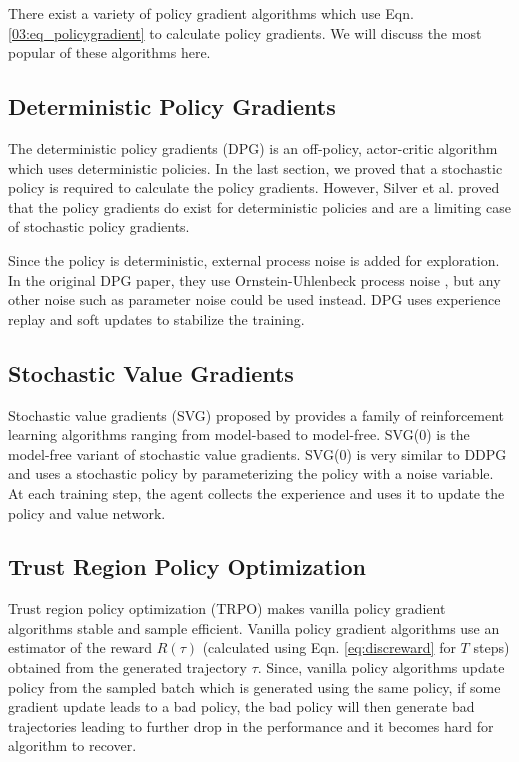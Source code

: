 There exist a variety of policy gradient algorithms which use Eqn. \ref{03:eq_policygradient} to calculate policy gradients. We will discuss the most popular of these algorithms here.

\subsection{Deterministic Policy Gradients}
The deterministic policy gradients (DPG) \cite{silver2014deterministic} is an off-policy, actor-critic algorithm which uses deterministic policies. In the last section, we proved that a stochastic policy is required to calculate the policy gradients. However, Silver et al. proved that the policy gradients do exist for deterministic policies and are a limiting case of stochastic policy gradients.

Since the policy is deterministic, external process noise is added for exploration. In the original DPG paper, they use Ornstein-Uhlenbeck process noise \cite{ounoise}, but any other noise such as parameter noise \cite{paramnoise} could be used instead. DPG uses experience replay and soft updates to stabilize the training. 

\subsection{Stochastic Value Gradients}
Stochastic value gradients (SVG) proposed by \cite{svg} provides a family of reinforcement learning algorithms ranging from model-based to model-free. SVG(0) is the model-free variant of stochastic value gradients. SVG(0) is very similar to DDPG and uses a stochastic policy by parameterizing the policy with a noise variable. At each training step, the agent collects the experience and uses it to update the policy and value network.


\subsection{Trust Region Policy Optimization}
Trust region policy optimization (TRPO) \cite{schulman2015trust} makes vanilla policy gradient algorithms stable and sample efficient. Vanilla policy gradient algorithms use an estimator of the reward $R(\tau)$ (calculated using Eqn. \ref{eq:discreward} for $T$ steps) obtained from the generated trajectory $\tau$. Since, vanilla policy algorithms update policy from the sampled batch which is generated using the same policy, if some gradient update leads to a bad policy, the bad policy will then generate bad trajectories leading to further drop in the performance and it becomes hard for algorithm to recover.

